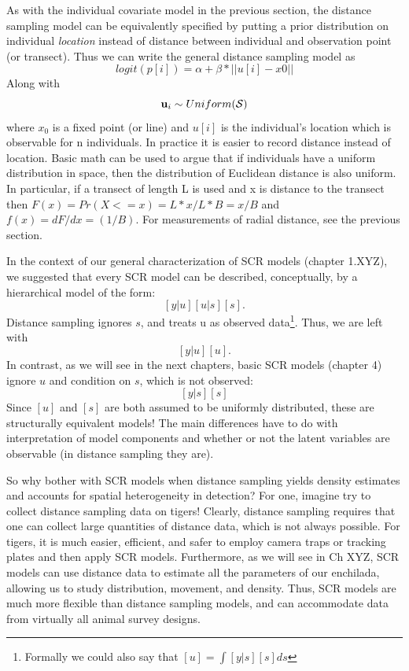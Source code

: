 As with the individual covariate model in the previous section, the
distance sampling model can be equivalently specified by putting a
prior distribution on individual {\it location} instead of distance
between individual and observation point (or transect).  Thus we can
write the general distance sampling model as
\[
 logit(p[i]) = \alpha + \beta*||u[i] - x0||
\]
Along with
\[
 {\bf u}_{i} \sim Uniform({\cal S})
\]
where $x_{0}$ is a fixed point (or line) and $u[i]$ is the individual's location which is observable for n individuals. In practice it is easier to record distance instead of location.  Basic math can be used to argue that if individuals have a uniform distribution in space, then the distribution of Euclidean distance is also uniform. In particular, if a transect of length L is used and x is distance to the transect then $F(x) = Pr(X<=x) = L*x/L*B = x/B$ and $f(x) = dF/dx = (1/B)$. For measurements of radial distance, see the previous section.

In the context of our general characterization of SCR models (chapter 1.XYZ), we suggested that every SCR model can be described, conceptually, by a hierarchical model of the form:
\[
 [y|u][u|s][s].
\]
Distance sampling ignores $s$, and treats u as observed data\footnote{Formally we could also say that $[u] = \int [y|s][s] ds$}. Thus, we are left with
\[
[y|u][u].
\]
In contrast, as we will see in the next chapters, basic SCR models (chapter 4) ignore $u$ and condition on $s$, which is not observed:
\[
[y|s][s]
\]
Since $[u]$ and $[s]$ are both assumed to be uniformly distributed, these are structurally equivalent  models! The main  differences have to do with interpretation of model components and whether or not the latent variables are observable (in distance sampling they are).

So why bother with SCR models when distance sampling yields density estimates and accounts for spatial  heterogeneity in detection? For one, imagine try to collect distance sampling data on tigers! Clearly, distance sampling requires that one can collect large quantities of distance data, which is not always possible. For tigers, it is much easier, efficient, and safer to employ camera traps or tracking plates and then apply SCR models. Furthermore, as we will see in Ch XYZ, SCR models can use distance data to estimate all the parameters of our enchilada, allowing us to study distribution, movement, and density. Thus, SCR models are much more flexible than distance sampling models, and can accommodate data from virtually all animal survey designs.


